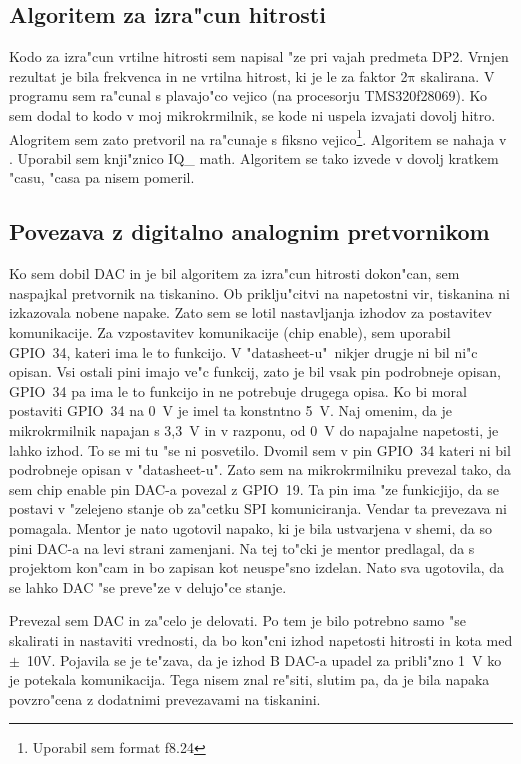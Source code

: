 \documentclass[a4paper]{article}
\begin{document}
\subsection{Algoritem za izra"cun hitrosti}  

Kodo za izra"cun vrtilne hitrosti sem napisal "ze pri vajah predmeta DP2. Vrnjen rezultat je bila frekvenca in ne vrtilna hitrost, ki je le za faktor 2$\mathrm{\pi}$ skalirana. V programu sem ra"cunal s plavajo"co vejico (na procesorju TMS320f28069). Ko sem dodal to kodo v moj mikrokrmilnik, se  kode ni uspela izvajati dovolj hitro. Alogritem sem zato pretvoril na ra"cunaje s fiksno vejico\footnote{Uporabil sem format f8.24}. Algoritem se nahaja v . Uporabil sem knji"znico IQ\_ math. Algoritem  se tako izvede v dovolj kratkem "casu, "casa pa nisem pomeril.


\subsection{Povezava z digitalno analognim pretvornikom}

Ko sem dobil DAC in je bil algoritem za  izra"cun hitrosti dokon"can, sem naspajkal pretvornik na tiskanino. Ob priklju"citvi na napetostni vir, tiskanina ni izkazovala nobene napake. Zato sem se lotil nastavljanja izhodov za postavitev komunikacije. Za vzpostavitev komunikacije (chip enable), sem uporabil GPIO~34, kateri ima le to funkcijo. V "datasheet-u"~nikjer drugje ni bil ni"c opisan. Vsi ostali pini imajo ve"c funkcij, zato je bil vsak pin podrobneje opisan, GPIO~34 pa ima le to funkcijo in ne potrebuje drugega opisa. Ko bi moral postaviti GPIO~34 na 0~V je imel ta konstntno 5~V. Naj omenim, da je mikrokrmilnik napajan s 3,3~V in v razponu, od 0~V do napajalne napetosti, je lahko izhod. To se mi tu "se ni posvetilo. Dvomil sem v pin GPIO~34 kateri ni bil podrobneje opisan v "datasheet-u". Zato sem na mikrokrmilniku prevezal tako, da sem chip enable pin DAC-a povezal z GPIO~19. Ta pin ima "ze funkicjijo, da se postavi v "zelejeno stanje ob za"cetku SPI komuniciranja. Vendar ta prevezava ni pomagala. Mentor je nato ugotovil napako, ki je bila ustvarjena v shemi, da so pini DAC-a na levi strani zamenjani. Na tej to"cki je mentor predlagal, da s projektom kon"cam in bo zapisan kot neuspe"sno izdelan. Nato sva ugotovila, da se lahko DAC "se preve"ze v delujo"ce stanje. 

Prevezal sem DAC in za"celo je delovati. Po tem je bilo potrebno samo "se skalirati in nastaviti vrednosti, da bo kon"cni izhod napetosti hitrosti in kota med $\mathrm{\pm}$~10V. Pojavila se je te"zava, da je izhod B DAC-a upadel za pribli"zno 1~V ko je potekala komunikacija. Tega nisem znal re"siti, slutim pa, da je bila napaka povzro"cena z dodatnimi prevezavami na tiskanini.
\end{document}
